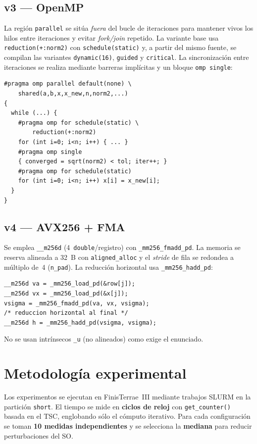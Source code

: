 \documentclass[a4paper,twocolumn]{article}
\begin{document}
\subsection{v3 --- OpenMP}

La región \texttt{parallel} se sitúa \textit{fuera} del bucle de
iteraciones para mantener vivos los hilos entre iteraciones y evitar
\textit{fork/join} repetido.  La variante base usa
\texttt{reduction(+:norm2)} con \texttt{schedule(static)} y, a partir del mismo
fuente, se compilan las variantes \texttt{dynamic(16)}, \texttt{guided} y
\texttt{critical}.  La sincronización entre iteraciones se realiza mediante
barreras implícitas y un bloque \texttt{omp single}:

\begin{lstlisting}
#pragma omp parallel default(none) \
    shared(a,b,x,x_new,n,norm2,...)
{
  while (...) {
    #pragma omp for schedule(static) \
        reduction(+:norm2)
    for (int i=0; i<n; i++) { ... }
    #pragma omp single
    { converged = sqrt(norm2) < tol; iter++; }
    #pragma omp for schedule(static)
    for (int i=0; i<n; i++) x[i] = x_new[i];
  }
}
\end{lstlisting}

\subsection{v4 --- AVX256 + FMA}

Se emplea \texttt{\_\_m256d} (4~\texttt{double}/registro) con
\texttt{\_mm256\_fmadd\_pd}.  La memoria se reserva alineada a 32~B con
\texttt{aligned\_alloc} y el \textit{stride} de fila se redondea a múltiplo
de~4 (\texttt{n\_pad}).  La reducción horizontal usa \texttt{\_mm256\_hadd\_pd}:

\begin{lstlisting}
__m256d va = _mm256_load_pd(&row[j]);
__m256d vx = _mm256_load_pd(&x[j]);
vsigma = _mm256_fmadd_pd(va, vx, vsigma);
/* reduccion horizontal al final */
__m256d h = _mm256_hadd_pd(vsigma, vsigma);
\end{lstlisting}

No se usan intrínsecos \texttt{\_u} (no alineados) como exige el enunciado.

\section{Metodología experimental}

Los experimentos se ejecutan en FinisTerrae~III mediante trabajos SLURM en la
partición \texttt{short}.  El tiempo se mide en \textbf{ciclos de reloj} con
\texttt{get\_counter()} basada en el TSC, englobando sólo el cómputo iterativo.
Para cada configuración se toman \textbf{10 medidas independientes} y se
selecciona la \textbf{mediana} para reducir perturbaciones del SO.
\end{document}

